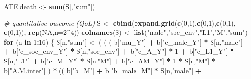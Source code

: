 \documentclass[
]{book}
\newenvironment{Shaded}{\begin{snugshade}}{\end{snugshade}}
\newcommand{\AttributeTok}[1]{\textcolor[rgb]{0.13,0.29,0.53}{#1}}
\newcommand{\CommentTok}[1]{\textcolor[rgb]{0.56,0.35,0.01}{\textit{#1}}}
\newcommand{\ConstantTok}[1]{\textcolor[rgb]{0.56,0.35,0.01}{#1}}
\newcommand{\ControlFlowTok}[1]{\textcolor[rgb]{0.13,0.29,0.53}{\textbf{#1}}}
\newcommand{\DecValTok}[1]{\textcolor[rgb]{0.00,0.00,0.81}{#1}}
\newcommand{\FunctionTok}[1]{\textcolor[rgb]{0.13,0.29,0.53}{\textbf{#1}}}
\newcommand{\NormalTok}[1]{#1}
\newcommand{\OtherTok}[1]{\textcolor[rgb]{0.56,0.35,0.01}{#1}}
\newcommand{\SpecialCharTok}[1]{\textcolor[rgb]{0.81,0.36,0.00}{\textbf{#1}}}
\newcommand{\StringTok}[1]{\textcolor[rgb]{0.31,0.60,0.02}{#1}}
\begin{document}
\begin{Shaded}
\begin{Highlighting}[]
\NormalTok{  ATE.death }\OtherTok{\textless{}{-}} \FunctionTok{sum}\NormalTok{(S[,}\StringTok{"sum"}\NormalTok{])}
  
  \CommentTok{\# quantitative outcome (QoL)}
\NormalTok{  S }\OtherTok{\textless{}{-}} \FunctionTok{cbind}\NormalTok{(}\FunctionTok{expand.grid}\NormalTok{(}\FunctionTok{c}\NormalTok{(}\DecValTok{0}\NormalTok{,}\DecValTok{1}\NormalTok{),}\FunctionTok{c}\NormalTok{(}\DecValTok{0}\NormalTok{,}\DecValTok{1}\NormalTok{),}\FunctionTok{c}\NormalTok{(}\DecValTok{0}\NormalTok{,}\DecValTok{1}\NormalTok{), }\FunctionTok{c}\NormalTok{(}\DecValTok{0}\NormalTok{,}\DecValTok{1}\NormalTok{)), }\FunctionTok{rep}\NormalTok{(}\ConstantTok{NA}\NormalTok{,}\AttributeTok{n=}\DecValTok{2}\SpecialCharTok{\^{}}\DecValTok{4}\NormalTok{))}
  \FunctionTok{colnames}\NormalTok{(S) }\OtherTok{\textless{}{-}} \FunctionTok{list}\NormalTok{(}\StringTok{"male"}\NormalTok{,}\StringTok{"soc\_env"}\NormalTok{,}\StringTok{"L1"}\NormalTok{,}\StringTok{"M"}\NormalTok{,}\StringTok{"sum"}\NormalTok{)}
  \ControlFlowTok{for}\NormalTok{ (n }\ControlFlowTok{in} \DecValTok{1}\SpecialCharTok{:}\DecValTok{16}\NormalTok{) \{}
\NormalTok{    S[n,}\StringTok{"sum"}\NormalTok{] }\OtherTok{\textless{}{-}}\NormalTok{ ( ( ( b[}\StringTok{"mu\_Y"}\NormalTok{] }\SpecialCharTok{+} 
\NormalTok{                          b[}\StringTok{"c\_male\_Y"}\NormalTok{] }\SpecialCharTok{*}\NormalTok{ S[n,}\StringTok{"male"}\NormalTok{] }\SpecialCharTok{+} 
\NormalTok{                          b[}\StringTok{"c\_soc\_env\_Y"}\NormalTok{] }\SpecialCharTok{*}\NormalTok{ S[n,}\StringTok{"soc\_env"}\NormalTok{] }\SpecialCharTok{+}
\NormalTok{                          b[}\StringTok{"c\_A\_Y"}\NormalTok{] }\SpecialCharTok{*} \DecValTok{1} \SpecialCharTok{+}
\NormalTok{                          b[}\StringTok{"c\_L1\_Y"}\NormalTok{] }\SpecialCharTok{*}\NormalTok{ S[n,}\StringTok{"L1"}\NormalTok{] }\SpecialCharTok{+}
\NormalTok{                          b[}\StringTok{"c\_M\_Y"}\NormalTok{] }\SpecialCharTok{*}\NormalTok{ S[n,}\StringTok{"M"}\NormalTok{] }\SpecialCharTok{+} 
\NormalTok{                          b[}\StringTok{"c\_AM\_Y"}\NormalTok{] }\SpecialCharTok{*} \DecValTok{1} \SpecialCharTok{*}\NormalTok{ S[n,}\StringTok{"M"}\NormalTok{] }\SpecialCharTok{*}\NormalTok{ b[}\StringTok{"A.M.inter"}\NormalTok{] ) }\SpecialCharTok{*}
\NormalTok{                        (( b[}\StringTok{"b\_M"}\NormalTok{] }\SpecialCharTok{+} 
\NormalTok{                             b[}\StringTok{"b\_male\_M"}\NormalTok{] }\SpecialCharTok{*}\NormalTok{ S[n,}\StringTok{"male"}\NormalTok{] }\SpecialCharTok{+} 

\end{Highlighting}
\end{Shaded}
\end{document}
